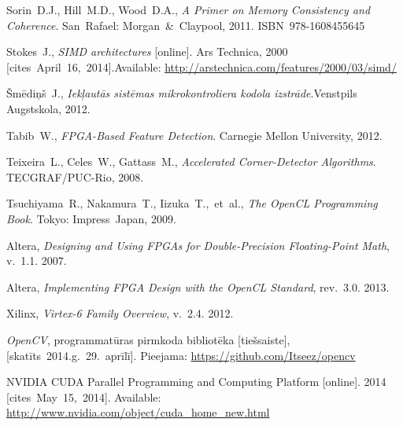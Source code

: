 {\begin{thebibliography}{99}
			Sorin~D.J., Hill~M.D., Wood~D.A.,
			\textit{A Primer on Memory Consistency and Coherence}.
			San~Rafael: Morgan~\&~Claypool, 2011. ISBN~978-1608455645
		
			Stokes~J.,
			\textit{SIMD architectures} [online]. Ars Technica, 2000 %
			[cites~April~16,~2014].\linebreak[1]
			Available: \url{http://arstechnica.com/features/2000/03/simd/}
		
			Šmēdiņš~J.,
			\textit{Iekļautās sistēmas mikrokontroliera kodola izstrāde}.\linebreak[1]
			Venstpils Augstskola, 2012.
		
			Tabib~W.,
			\textit{FPGA-Based Feature Detection}.
			Carnegie Mellon University, 2012.
		
			Teixeira~L., Celes~W., Gattass~M.,
			\textit{Accelerated Corner-Detector Algorithms}.
			TECGRAF/PUC-Rio, 2008.
		
			Tsuchiyama~R., Nakamura~T., Iizuka~T.,~et~al.,
			\textit{The OpenCL Programming Book}. Tokyo: Impress~Japan, 2009.
		
			Altera, \textit{Designing and Using FPGAs for
				Double-Precision Floating-Point Math}, v.~1.1. 2007.
		
			Altera, \textit{Implementing FPGA Design with
				the OpenCL Standard}, rev.~3.0. 2013.
		
			Xilinx, \textit{Virtex-6 Family Overview}, v.~2.4. 2012.
		
			\textit{OpenCV}, programmatūras pirmkoda bibliotēka [tiešsaiste],
			[skatīts~2014.g.~29.~aprīlī].
			Pieejama: \url{https://github.com/Itseez/opencv}
		
			NVIDIA CUDA Parallel Programming and Computing Platform [online].
			2014 [cites~May~15,~2014].
			Available: \url{http://www.nvidia.com/object/cuda_home_new.html}
	\end{thebibliography}
} %
